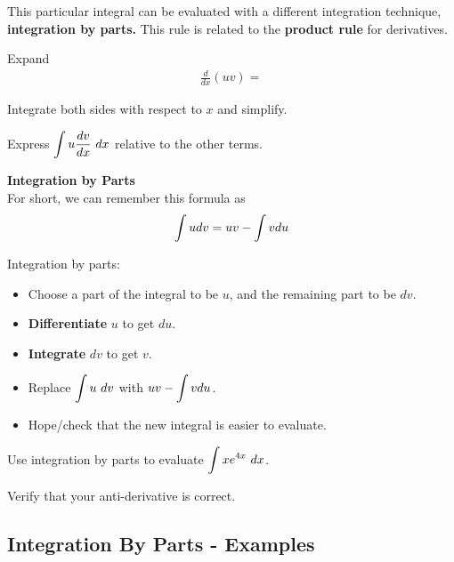 \vfill

\newpage

This particular integral can be evaluated with a different integration
technique, {\bf integration by parts.}  This rule is related to the
{\bf product rule} for derivatives.  

\problem Expand
\begin{align*}
\frac{d}{dx} \left(u v\right) = 
\end{align*}

Integrate both sides with respect to $x$ and simplify.

\vfill

Express $\displaystyle \int u \frac{dv}{dx} ~dx$ relative to the other terms.

\vfill


\newpage
\begin{boxnote}
  {\bf Integration by Parts} \\
  For short, we can remember this formula as
\begin{align*}
\displaystyle \int udv = uv - \int vdu
\end{align*}
\end{boxnote}

\vspace{3mm} Integration by parts: 
\begin{itemize}
\item Choose a part of the integral to be $u$, and the remaining part
  to be $dv$.
\item {\bf Differentiate} $u$ to get $du$.
\item {\bf Integrate} $dv$ to get $v$.
\item Replace $\displaystyle \int u ~dv$ with $\displaystyle uv - \int v du$.
\item Hope/check that the new integral is easier to evaluate.
\end{itemize}


\newpage

\problem Use integration by parts to evaluate $\displaystyle \int x e^{4x} ~dx$.

\vfill
\vfill
\vfill

\newpage
\problem Verify that your anti-derivative is correct.

\vfill

\newpage
{}
\subsection*{Integration By Parts - Examples}

